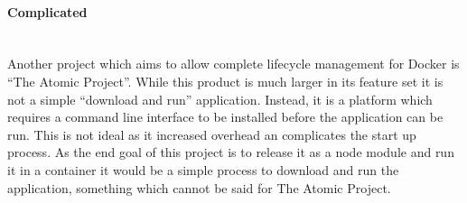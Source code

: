\documentclass{article}
\begin{document}
\paragraph{Complicated}\mbox{}\\
Another project which aims to allow complete lifecycle management for Docker is ``The Atomic Project''. While this product is much larger in its feature set it is not a simple ``download and run'' application. Instead, it is a platform which requires a command line interface to be installed before the application can be run. This is not ideal as it increased overhead an complicates the start up process. As the end goal of this project is to release it as a node module and run it in a container it would be a simple process to download and run the application, something which cannot be said for The Atomic Project.


\newpage

\end{document}
